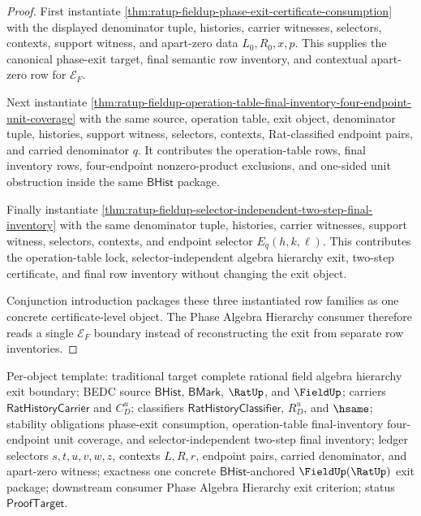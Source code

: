 \begin{proof}
First instantiate
\autoref{thm:ratup-fieldup-phase-exit-certificate-consumption} with the
displayed denominator tuple, histories, carrier witnesses, selectors, contexts,
support witness, and apart-zero data $L_0,R_0,x,p$.
This supplies the canonical phase-exit target, final semantic row inventory,
and contextual apart-zero row for $\mathcal E_F$.

Next instantiate
\autoref{thm:ratup-fieldup-operation-table-final-inventory-four-endpoint-unit-coverage}
with the same source, operation table, exit object, denominator tuple,
histories, support witness, selectors, contexts, Rat-classified endpoint pairs,
and carried denominator $q$. It contributes the operation-table rows, final
inventory rows, four-endpoint nonzero-product exclusions, and one-sided unit
obstruction inside the same $\mathsf{BHist}$ package.

Finally instantiate
\autoref{thm:ratup-fieldup-selector-independent-two-step-final-inventory} with
the same denominator tuple, histories, carrier witnesses, support witness,
selectors, contexts, and endpoint selector $E_q(h,k,\ell)$. This contributes
the operation-table lock, selector-independent algebra hierarchy exit,
two-step certificate, and final row inventory without changing the exit object.

Conjunction introduction packages these three instantiated row families as one
concrete certificate-level object. The Phase Algebra Hierarchy consumer
therefore reads a single $\mathcal E_F$ boundary instead of reconstructing the
exit from separate row inventories.
\end{proof}

Per-object template: traditional target complete rational field algebra
hierarchy exit boundary; BEDC source $\mathsf{BHist}$, $\mathsf{BMark}$,
$\RatUp$, and $\FieldUp$; carriers
$\mathsf{RatHistoryCarrier}$ and $C_D^u$; classifiers
$\mathsf{RatHistoryClassifier}$, $R_D^u$, and $\hsame$;
stability obligations phase-exit consumption, operation-table final-inventory
four-endpoint unit coverage, and selector-independent two-step final inventory;
ledger
selectors $s,t,u,v,w,z$, contexts $L,R,r$, endpoint pairs, carried
denominator, and apart-zero witness; exactness one
concrete $\mathsf{BHist}$-anchored $\FieldUp(\RatUp)$ exit package;
downstream consumer Phase Algebra Hierarchy exit criterion; status
$\mathsf{ProofTarget}$.


